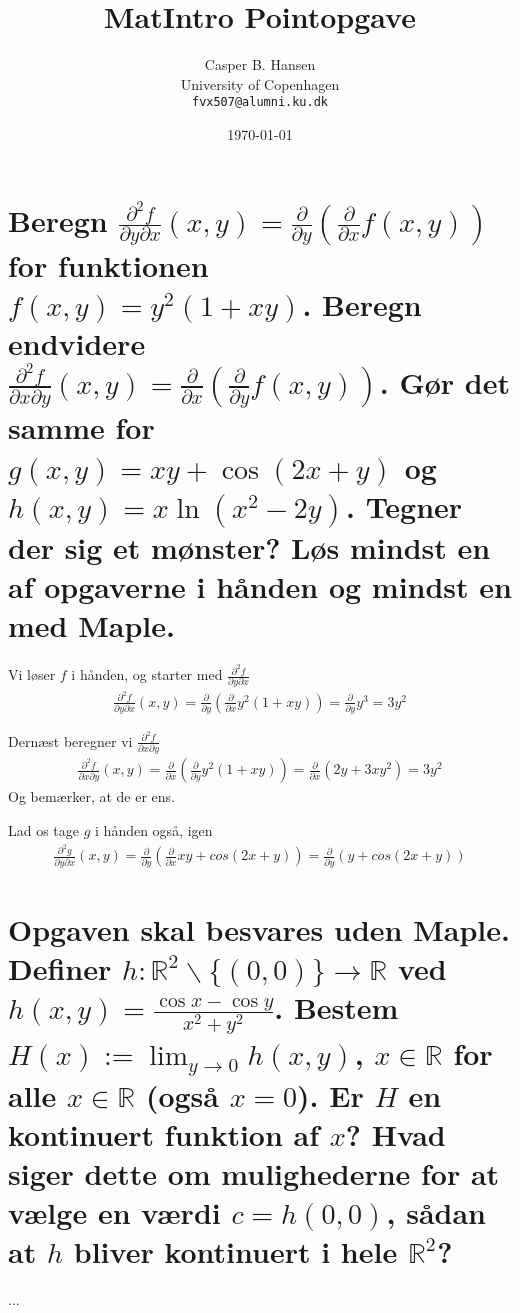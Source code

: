 \documentclass[11pt,a4paper]{article}
\title{MatIntro Pointopgave \assignmentnumber}
\author
{
    Casper B. Hansen\\
    University of Copenhagen\\
    {\tt fvx507@alumni.ku.dk}
}
\date{\today}
\newcommand{\limit}[2]{\lim_{#1 \rightarrow #2}}
\begin{document}


\section
{
    \mdseries
    Beregn $\frac{\partial^2 f}{\partial y \partial x} (x,y) =
    \frac{\partial}{\partial y}
    \left( \frac{\partial}{\partial x} f(x,y) \right)$ for funktionen $f(x,y)
    = y^2 (1 + xy)$. Beregn endvidere $\frac{\partial^2 f}{\partial x \partial y}
    (x,y) = \frac{\partial}{\partial x} \left( \frac{\partial}{\partial y} f(x,y)
    \right)$. Gør det samme for $g(x,y) = xy + \cos(2x + y)$ og $h(x,y) = x \ln
    (x^2 - 2y)$. Tegner der sig et mønster? Løs mindst en af opgaverne i hånden
    og mindst en med Maple.
}
Vi løser $f$ i hånden, og starter med $\frac{\partial^2 f}{\partial y \partial x}$
\begin{align}
    \frac{\partial^2 f}{\partial y \partial x} (x,y)
    = \frac{\partial}{\partial y}
      \left( \frac{\partial}{\partial x} y^2 (1 + xy) \right)
    = \frac{\partial}{\partial y} y^3
    = 3y^2
\end{align}

Dernæst beregner vi $\frac{\partial^2 f}{\partial x \partial y}$
\begin{align}
    \frac{\partial^2 f}{\partial x \partial y} (x,y)
    = \frac{\partial}{\partial x}
      \left( \frac{\partial}{\partial y} y^2 (1 + xy) \right)
    = \frac{\partial}{\partial x} \left( 2y + 3xy^2 \right)
    = 3y^2
\end{align}
Og bemærker, at de er ens.

Lad os tage $g$ i hånden også, igen
\begin{align}
    \frac{\partial^2 g}{\partial y \partial x} (x,y)
    = \frac{\partial}{\partial y}
      \left( \frac{\partial}{\partial x} xy + cos(2x + y) \right)
    = \frac{\partial}{\partial y}
      \left( y + cos(2x + y) \right)
\end{align}

\section
{
    \mdseries
    Opgaven skal besvares uden Maple. Definer $h : \mathbb{R}^2 \backslash
    \{(0,0)\} \rightarrow \mathbb{R}$ ved $h(x,y) = \frac{\cos x - \cos y}
    {x^2 + y^2}$. Bestem $H(x) := \limit{y}{0} h(x,y)$, $x \in \mathbb{R}$ for
    alle $x \in \mathbb{R}$ (også $x = 0$). Er $H$ en kontinuert funktion af
    $x$? Hvad siger dette om mulighederne for at vælge en værdi $c = h(0,0)$,
    sådan at $h$ bliver kontinuert i hele $\mathbb{R}^2$?
}
...
\end{document}

